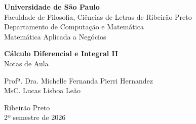 
\begin{titlepage}
\thispagestyle{empty}

\begin{center}
    {\large\bfseries Universidade de São Paulo}\\[2mm]
    {\normalsize Faculdade de Filosofia, Ciências de Letras de Ribeirão Preto \\ Departamento de Computação e Matemática}\\[1mm]
    {\normalsize Matemática Aplicada a Negócios}
\end{center}

\vfill

\begin{center}
    {\Large\bfseries Cálculo Diferencial e Integral II}\\[6mm]
    {\large Notas de Aula}
\end{center}

\vfill

\begin{center}
    {\large Profª. Dra. Michelle Fernanda Pierri Hernandez \\ MsC. Lucas Lisboa Leão}
\end{center}

\vfill

\begin{center}
    {\normalsize Ribeirão Preto}\\
    {\normalsize 2º semestre de 2026}
\end{center}

\end{titlepage}
